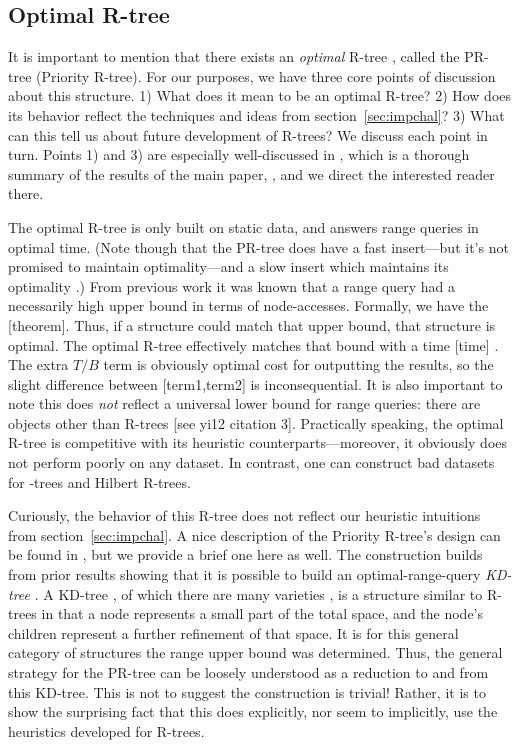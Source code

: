 \subsection{Optimal R-tree}
It is important to mention that there exists an \emph{optimal} R-tree \cite{argeberghaverkortyi04}, called the PR-tree (Priority R-tree).
For our purposes, we have three core points of discussion about this structure.
1) What does it mean to be an optimal R-tree?
2) How does its behavior reflect the techniques and ideas from section~\ref{sec:impchal}?
3) What can this tell us about future development of R-trees?
We discuss each point in turn.
Points 1) and 3) are especially well-discussed in \cite{yi12}, which is a thorough summary of the results of the main paper, \cite{argeberghaverkortyi04}, and we direct the interested reader there.

The optimal R-tree is only built on static data, and answers range queries in optimal time.
(Note though that the PR-tree does have a fast insert---but it's not promised to maintain optimality---and a slow insert which maintains its optimality \cite{argeberghaverkortyi04}.)
From previous work \cite{kanthsingh99} it was known that a range query had a necessarily high upper bound in terms of node-accesses.
Formally, we have the [theorem].
Thus, if a structure could match that upper bound, that structure is optimal.
The optimal R-tree effectively matches that bound with a time [time] \cite{yi12}.
The extra $T/B$ term is obviously optimal cost for outputting the results, so the slight difference between [term1,term2] is inconsequential.
It is also important to note this does \emph{not} reflect a universal lower bound for range queries: there are objects other than R-trees [see yi12 citation 3].
Practically speaking, the optimal R-tree is competitive with its heuristic counterparts---moreover, it obviously does not perform poorly on any dataset.
In contrast, one can construct bad datasets for \rstar-trees and Hilbert R-trees.

Curiously, the behavior of this R-tree does not reflect our heuristic intuitions from section~\ref{sec:impchal}.
A nice description of the Priority R-tree's design can be found in \cite{thebook}, but we provide a brief one here as well.
The construction builds from prior results showing that it is possible to build an optimal-range-query \emph{KD-tree} \cite{agarwalberggudmundssonhammarhaverkort01}.
A KD-tree \cite{bentley75}, of which there are many varieties \cite{gaedegunther98}, is a structure similar to R-trees in that a node represents a small part of the total space, and the node's children represent a further refinement of that space.
It is for this general category of structures the range upper bound was determined.
Thus, the general strategy for the PR-tree can be loosely understood as a reduction to and from this KD-tree.
This is not to suggest the construction is trivial! Rather, it is to show the surprising fact that this does explicitly, nor seem to implicitly, use the heuristics developed for R-trees.

